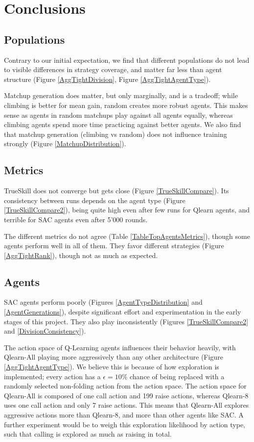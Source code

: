 \chapter{Conclusions}

\section{Populations}
Contrary to our initial expectation, we find that different populations do not lead to visible differences in strategy coverage, and matter far less than agent structure (Figure \ref{AggTightDivision}, Figure \ref{AggTightAgentType}).

Matchup generation does matter, but only marginally, and is a tradeoff; while climbing is better for mean gain, random creates more robust agents. This makes sense as agents in random matchups play against all agents equally, whereas climbing agents spend more time practicing against better agents.
We also find that matchup generation (climbing vs random) does not influence training strongly (Figure \ref{MatchupDistribution}).

\section{Metrics}
TrueSkill does not converge but gets close (Figure \ref{TrueSkillCompare}). Its consistency between runs depends on the agent type (Figure \ref{TrueSkillCompare2}), being quite high even after few runs for Qlearn agents, and terrible for SAC agents even after 5'000 rounds.

The different metrics do not agree (Table \ref{TableTopAgentsMetrics}), though some agents perform well in all of them. They favor different strategies (Figure \ref{AggTightRank}), though not as much as expected.

\section{Agents}
\label{ConclusionAgents}

SAC agents perform poorly (Figures \ref{AgentTypeDistribution} and \ref{AgentGenerations}), despite significant effort and experimentation in the early stages of this project. They also play inconsistently (Figures \ref{TrueSkillCompare2} and \ref{DivisionConsistency}).

The action space of Q-Learning agents influences their behavior heavily, with Qlearn-All playing more aggressively than any other architecture (Figure \ref{AggTightAgentType}).
We believe this is because of how exploration is implemented; every action has a $\epsilon = 10\%$ chance of being replaced with a randomly selected non-folding action from the action space. The action space for Qlearn-All is composed of one call action and 199 raise actions, whereas Qlearn-8 uses one call action and only 7 raise actions. This means that Qlearn-All explores aggressive actions more than Qlearn-8, and more than other agents like SAC. A further experiment would be to weigh this exploration likelihood by action type, such that calling is explored as much as raising in total.

